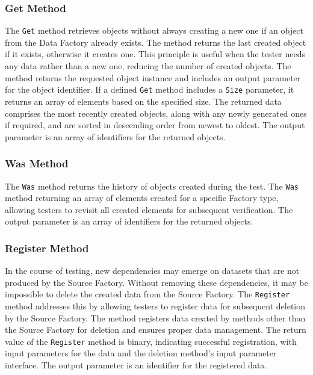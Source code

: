 \subsubsection{Get Method}\label{subsec:get}
The \texttt{Get} method retrieves objects without always creating a new one if an object from the Data Factory already exists. The method returns the last created object if it exists, otherwise it creates one. This principle is useful when the tester needs any data rather than a new one, reducing the number of created objects. The method returns the requested object instance and includes an output parameter for the object identifier. If a defined \texttt{Get} method includes a \texttt{Size} parameter, it returns an array of elements based on the specified size. The returned data comprises the most recently created objects, along with any newly generated ones if required, and are sorted in descending order from newest to oldest. The output parameter is an array of identifiers for the returned objects.

\subsubsection{Was Method}\label{subsec:was}
The \texttt{Was} method returns the history of objects created during the test. The \texttt{Was} method returning an array of elements created for a specific Factory type, allowing testers to revisit all created elements for subsequent verification. The output parameter is an array of identifiers for the returned objects.

\subsubsection{Register Method}\label{subsec:register}
In the course of testing, new dependencies may emerge on datasets that are not produced by the Source Factory. Without removing these dependencies, it may be impossible to delete the created data from the Source Factory. The \texttt{Register} method addresses this by allowing testers to register data for subsequent deletion by the Source Factory. The method registers data created by methods other than the Source Factory for deletion and ensures proper data management. The return value of the \texttt{Register} method is binary, indicating successful registration, with input parameters for the data and the deletion method's input parameter interface. The output parameter is an identifier for the registered data.

